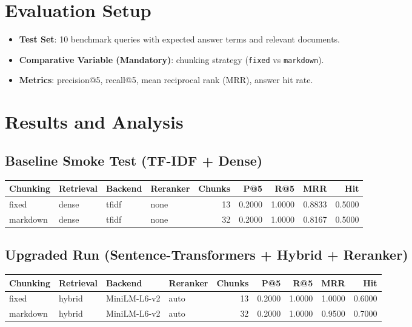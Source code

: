 \documentclass[11pt,a4paper]{article}
\begin{document}
\section{Evaluation Setup}
\begin{itemize}
  \item \textbf{Test Set}: 10 benchmark queries with expected answer terms and relevant documents.
  \item \textbf{Comparative Variable (Mandatory)}: chunking strategy (\texttt{fixed} vs \texttt{markdown}).
  \item \textbf{Metrics}: precision@5, recall@5, mean reciprocal rank (MRR), answer hit rate.
\end{itemize}

\section{Results and Analysis}
\subsection{Baseline Smoke Test (TF-IDF + Dense)}
\begin{center}
\begin{tabular}{l l l l r r r r r}
\toprule
Chunking & Retrieval & Backend & Reranker & Chunks & P@5 & R@5 & MRR & Hit \\
\midrule
fixed & dense & tfidf & none & 13 & 0.2000 & 1.0000 & 0.8833 & 0.5000 \\
markdown & dense & tfidf & none & 32 & 0.2000 & 1.0000 & 0.8167 & 0.5000 \\
\bottomrule
\end{tabular}
\end{center}

\subsection{Upgraded Run (Sentence-Transformers + Hybrid + Reranker)}
\begin{center}
\begin{tabular}{l l l l r r r r r}
\toprule
Chunking & Retrieval & Backend & Reranker & Chunks & P@5 & R@5 & MRR & Hit \\
\midrule
fixed & hybrid & MiniLM-L6-v2 & auto & 13 & 0.2000 & 1.0000 & 1.0000 & 0.6000 \\
markdown & hybrid & MiniLM-L6-v2 & auto & 32 & 0.2000 & 1.0000 & 0.9500 & 0.7000 \\
\bottomrule
\end{tabular}
\end{center}
\end{document}
